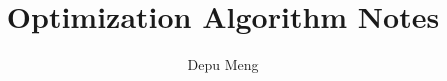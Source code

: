 \documentclass[times]{cls/mcp-acm}
\begin{document}
\frontmatter
\title{Optimization Algorithm Notes}
\author{Depu Meng}


\maketitle
\tableofcontents
%
\mainmatter




%
% 
\end{document}
